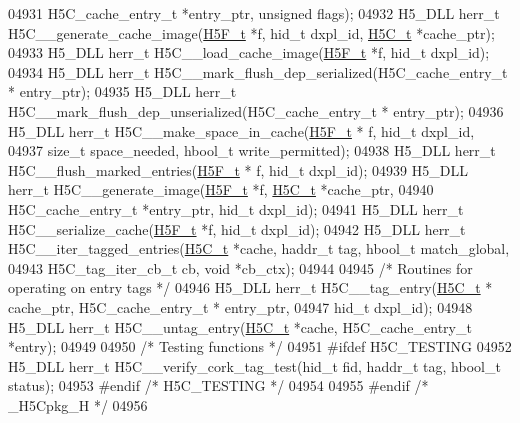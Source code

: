\begin{DoxyCode}
04931     H5C\_cache\_entry\_t *entry\_ptr, \textcolor{keywordtype}{unsigned} flags);
04932 H5\_DLL herr\_t H5C\_\_generate\_cache\_image(\hyperlink{struct_h5_f__t}{H5F\_t} *f, hid\_t dxpl\_id, \hyperlink{struct_h5_c__t}{H5C\_t} *cache\_ptr);
04933 H5\_DLL herr\_t H5C\_\_load\_cache\_image(\hyperlink{struct_h5_f__t}{H5F\_t} *f, hid\_t dxpl\_id);
04934 H5\_DLL herr\_t H5C\_\_mark\_flush\_dep\_serialized(H5C\_cache\_entry\_t * entry\_ptr);
04935 H5\_DLL herr\_t H5C\_\_mark\_flush\_dep\_unserialized(H5C\_cache\_entry\_t * entry\_ptr);
04936 H5\_DLL herr\_t H5C\_\_make\_space\_in\_cache(\hyperlink{struct_h5_f__t}{H5F\_t} * f, hid\_t dxpl\_id,
04937     \textcolor{keywordtype}{size\_t}  space\_needed, hbool\_t write\_permitted);
04938 H5\_DLL herr\_t H5C\_\_flush\_marked\_entries(\hyperlink{struct_h5_f__t}{H5F\_t} * f, hid\_t dxpl\_id);
04939 H5\_DLL herr\_t H5C\_\_generate\_image(\hyperlink{struct_h5_f__t}{H5F\_t} *f, \hyperlink{struct_h5_c__t}{H5C\_t} *cache\_ptr,
04940     H5C\_cache\_entry\_t *entry\_ptr, hid\_t dxpl\_id);
04941 H5\_DLL herr\_t H5C\_\_serialize\_cache(\hyperlink{struct_h5_f__t}{H5F\_t} *f, hid\_t dxpl\_id);
04942 H5\_DLL herr\_t H5C\_\_iter\_tagged\_entries(\hyperlink{struct_h5_c__t}{H5C\_t} *cache, haddr\_t tag, hbool\_t match\_global,
04943     H5C\_tag\_iter\_cb\_t cb, \textcolor{keywordtype}{void} *cb\_ctx);
04944 
04945 \textcolor{comment}{/* Routines for operating on entry tags */}
04946 H5\_DLL herr\_t H5C\_\_tag\_entry(\hyperlink{struct_h5_c__t}{H5C\_t} * cache\_ptr, H5C\_cache\_entry\_t * entry\_ptr,
04947     hid\_t dxpl\_id);
04948 H5\_DLL herr\_t H5C\_\_untag\_entry(\hyperlink{struct_h5_c__t}{H5C\_t} *cache, H5C\_cache\_entry\_t *entry);
04949 
04950 \textcolor{comment}{/* Testing functions */}
04951 \textcolor{preprocessor}{#ifdef H5C\_TESTING}
04952 H5\_DLL herr\_t H5C\_\_verify\_cork\_tag\_test(hid\_t fid, haddr\_t tag, hbool\_t status);
04953 \textcolor{preprocessor}{#endif }\textcolor{comment}{/* H5C\_TESTING */}\textcolor{preprocessor}{}
04954 
04955 \textcolor{preprocessor}{#endif }\textcolor{comment}{/* \_H5Cpkg\_H */}\textcolor{preprocessor}{}
04956 
\end{DoxyCode}
